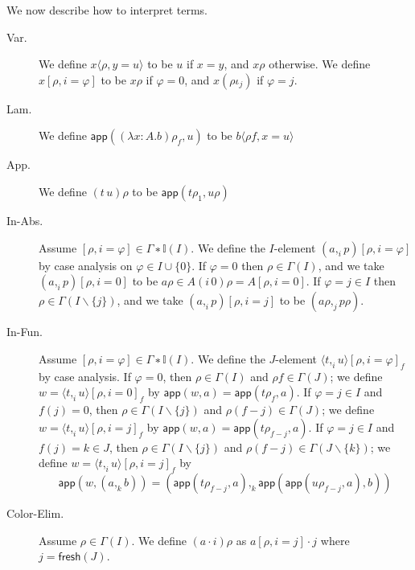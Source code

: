 \documentclass[english]{PaperTools/latex/lipics}
\newcommand\param[1]{\!\cdot\!#1}
\newcommand\fp[3]{⟨#2 ,_{#1} #3⟩}
\def\fresh#1{\mathsf{fresh}(#1)}
\def\app#1#2{\mathsf{app}(#1,#2)}
\begin{document}
\bigskip
We now describe how to interpret terms.
\begin{description}
  \item[\sc Var.]
    We define $x⟨ρ,y=u⟩$ to be $u$ if $x = y$, and $xρ$ otherwise.
    We define $x[ρ,i=φ]$ to be $xρ$ if $φ = 0$, and
    $x(ρι_j)$ if $φ = j$.

  \item[\sc Lam.]
    We define $\app{(λ x:A.b)ρ_f}{u}$ to be $b⟨ρf,x=u⟩$

  \item[\sc App.]
    We define $(t\,u)ρ$ to be $\app{tρ_1}{uρ}$

  \item[\sc In-Abs.]
    Assume $[ρ,i=φ] ∈ Γ∗𝕀(I)$.  We define the $I$-element $(a ,_i p)[ρ,i=φ]$
    by case analysis on $φ ∈ I ∪ \{0\}$.
    If $φ = 0$ then $ρ ∈ Γ(I)$, and we take $(a ,_i p)[ρ,i=0]$ to be
    $aρ ∈ A(i\,0)ρ = A[ρ,i=0]$.
    If $φ = j ∈ I$ then $ρ ∈ Γ(I\backslash\{j\})$, and we take
    $(a ,_i p)[ρ,i=j]$ to be $(aρ ,_j pρ)$.

  \item[\sc In-Fun.]
    Assume $[ρ,i=φ] ∈ Γ∗𝕀(I)$.  We define the $J$-element ${\fp i t u}[ρ,i=φ]_f$
    by case analysis.
    If $φ = 0$, then $ρ ∈ Γ(I)$ and $ρf ∈ Γ(J)$; we define
    $w = {\fp i t u}[ρ,i=0]_f$ by $\app{w}{a} = \app{tρ_f}{a}$.
    If $φ = j ∈ I$ and $f(j) = 0$, then $ρ ∈ Γ(I\backslash\{j\})$ and $ρ(f-j) ∈ Γ(J)$;
    we define $w = {\fp i t u}[ρ,i=j]_f$ by $\app{w}{a} = \app{tρ_{f-j}}{a}$.
    If $φ = j ∈ I$ and $f(j) = k ∈ J$, then $ρ ∈ Γ(I\backslash\{j\})$ and $ρ(f-j) ∈ Γ(J\backslash\{k\})$;
    we define $w = {\fp i t u}[ρ,i=j]_f$ by
    $$\app{w}{(a ,_k b)} = ( \app{tρ_{f-j}}{a} ,_k {\app{\app{uρ_{f-j}}{a}}{b}} )$$

  \item[\sc Color-Elim.]
    Assume $ρ ∈ Γ(I)$.  We define $(a \param i)ρ$ as
    $a[ρ,i=j]·j$ where $j = \fresh{J}$.
\end{description}
\end{document}

